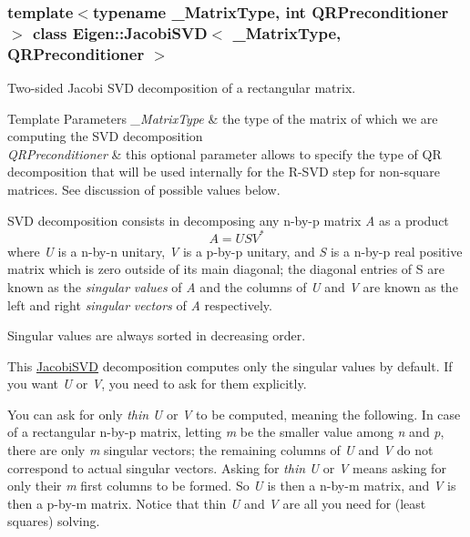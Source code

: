 \subsubsection*{template$<$typename \+\_\+\+Matrix\+Type, int Q\+R\+Preconditioner$>$\newline
class Eigen\+::\+Jacobi\+S\+V\+D$<$ \+\_\+\+Matrix\+Type, Q\+R\+Preconditioner $>$}

Two-\/sided Jacobi S\+VD decomposition of a rectangular matrix. 


\begin{DoxyTemplParams}{Template Parameters}
{\em \+\_\+\+Matrix\+Type} & the type of the matrix of which we are computing the S\+VD decomposition \\
\hline
{\em Q\+R\+Preconditioner} & this optional parameter allows to specify the type of QR decomposition that will be used internally for the R-\/\+S\+VD step for non-\/square matrices. See discussion of possible values below.\\
\hline
\end{DoxyTemplParams}
S\+VD decomposition consists in decomposing any n-\/by-\/p matrix {\itshape A} as a product \[ A = U S V^* \] where {\itshape U} is a n-\/by-\/n unitary, {\itshape V} is a p-\/by-\/p unitary, and {\itshape S} is a n-\/by-\/p real positive matrix which is zero outside of its main diagonal; the diagonal entries of S are known as the {\itshape singular} {\itshape values} of {\itshape A} and the columns of {\itshape U} and {\itshape V} are known as the left and right {\itshape singular} {\itshape vectors} of {\itshape A} respectively.

Singular values are always sorted in decreasing order.

This \hyperlink{group___s_v_d___module_class_eigen_1_1_jacobi_s_v_d}{Jacobi\+S\+VD} decomposition computes only the singular values by default. If you want {\itshape U} or {\itshape V}, you need to ask for them explicitly.

You can ask for only {\itshape thin} {\itshape U} or {\itshape V} to be computed, meaning the following. In case of a rectangular n-\/by-\/p matrix, letting {\itshape m} be the smaller value among {\itshape n} and {\itshape p}, there are only {\itshape m} singular vectors; the remaining columns of {\itshape U} and {\itshape V} do not correspond to actual singular vectors. Asking for {\itshape thin} {\itshape U} or {\itshape V} means asking for only their {\itshape m} first columns to be formed. So {\itshape U} is then a n-\/by-\/m matrix, and {\itshape V} is then a p-\/by-\/m matrix. Notice that thin {\itshape U} and {\itshape V} are all you need for (least squares) solving.


